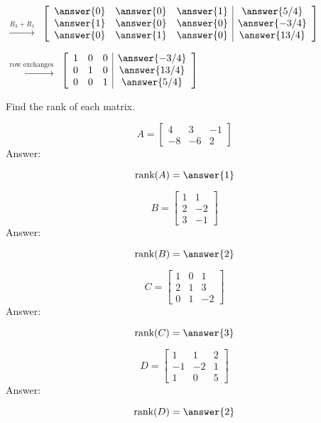 \documentclass{ximera}
\begin{document}
\begin{problem}
\begin{problem}
\begin{center}
 
$ \begin{array}{c}
 \\
 \\
 \xrightarrow{R_3+R_1}
\end{array}$
$\left[\begin{array}{ccc|c}  
 \answer{0}&\answer{0}&\answer{1}&\answer{5/4}\\\answer{1}&\answer{0}&\answer{0}&\answer{-3/4}\\\answer{0}&\answer{1}&\answer{0}&\answer{13/4}
 \end{array}\right]$
 
 
$ \begin{array}{c}
 \\
 \xrightarrow{\mbox{row exchanges}}\\
\\
\end{array}$
$\left[\begin{array}{ccc|c}  
 1&0&0&\answer{-3/4}\\0&1&0&\answer{13/4}\\0&0&1&\answer{5/4}
 \end{array}\right]$
\end{center}
 \end{problem}
\end{problem}

\begin{problem}
Find the rank of each matrix.
\begin{problem}\label{prob:rankofmat1}
$$A=\begin{bmatrix}4&3&-1\\-8&-6&2\end{bmatrix}$$
Answer:

$$\mbox{rank}(A)=\answer{1}$$
\end{problem}

\begin{problem}\label{prob:rankofmat2}
$$B=\begin{bmatrix}1&1\\2&-2\\3&-1\end{bmatrix}$$
Answer:

$$\mbox{rank}(B)=\answer{2}$$
\end{problem}

\begin{problem}\label{prob:rankofmat3}
$$C=\begin{bmatrix}1&0&1\\2&1&3\\0&1&-2\end{bmatrix}$$
Answer:

$$\mbox{rank}(C)=\answer{3}$$
\end{problem}

\begin{problem}\label{prob:rankofmat4}
$$D=\begin{bmatrix}1&1&2\\-1&-2&1\\1&0&5\end{bmatrix}$$
Answer:

$$\mbox{rank}(D)=\answer{2}$$
\end{problem}
\end{problem}
\end{document}
